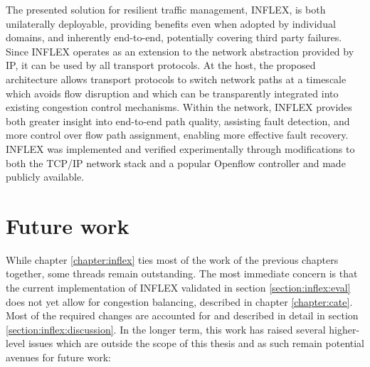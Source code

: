 The presented solution for resilient traffic management, INFLEX, is both unilaterally deployable, providing benefits even when adopted by individual domains, and inherently end-to-end, potentially covering third party failures.
Since INFLEX operates as an extension to the network abstraction provided by \ac{IP}, it can be used by all transport protocols.
At the host, the proposed architecture allows transport protocols to switch network paths at a timescale which avoids flow disruption and which can be transparently integrated into existing congestion control mechanisms.
Within the network, INFLEX provides both greater insight into end-to-end path quality, assisting fault detection, and more control over flow path assignment, enabling more effective fault recovery. 
INFLEX was implemented and verified experimentally through modifications to both the \ac{TCP}/\ac{IP} network stack and a popular Openflow controller \cite{pox} and made publicly available.



\section{Future work}

While chapter \ref{chapter:inflex} ties most of the work of the previous chapters together, some threads remain outstanding.
The most immediate concern is that the current implementation of INFLEX validated in section \ref{section:inflex:eval} does not yet allow for congestion balancing, described in chapter \ref{chapter:cate}.
Most of the required changes are accounted for and described in detail in section \ref{section:inflex:discussion}.
In the longer term, this work has raised several higher-level issues which are outside the scope of this thesis and as such remain potential avenues for future work:

